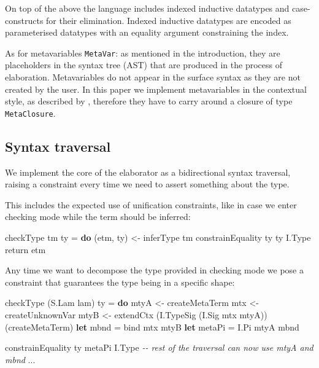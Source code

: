 \documentclass[
  sigconf,
  screen,
  review]{acmart}
\newenvironment{Shaded}{}{}
\newcommand{\CommentTok}[1]{\textcolor[rgb]{0.38,0.63,0.69}{\textit{#1}}}
\newcommand{\DataTypeTok}[1]{\textcolor[rgb]{0.56,0.13,0.00}{#1}}
\newcommand{\FunctionTok}[1]{\textcolor[rgb]{0.02,0.16,0.49}{#1}}
\newcommand{\KeywordTok}[1]{\textcolor[rgb]{0.00,0.44,0.13}{\textbf{#1}}}
\newcommand{\NormalTok}[1]{#1}
\newcommand{\OperatorTok}[1]{\textcolor[rgb]{0.40,0.40,0.40}{#1}}
\newcommand{\OtherTok}[1]{\textcolor[rgb]{0.00,0.44,0.13}{#1}}
\begin{document}
On top of the above the language includes indexed inductive datatypes
and case-constructs for their elimination. Indexed inductive datatypes
are encoded as parameterised datatypes with an equality argument
constraining the index.

As for metavariables \texttt{MetaVar}: as mentioned in the introduction,
they are placeholders in the syntax tree (AST) that are produced in the
process of elaboration. Metavariables do not appear in the surface
syntax as they are not created by the user. In this paper we implement
metavariables in the contextual style, as described by
\citet{abelHigherOrderDynamicPattern2011}, therefore they have to carry
around a closure of type \texttt{MetaClosure}.

\hypertarget{syntax-traversal}{%
\subsection{Syntax traversal}\label{syntax-traversal}}

We implement the core of the elaborator as a bidirectional syntax
traversal, raising a constraint every time we need to assert something
about the type.

This includes the expected use of unification constraints, like in case
we enter checking mode while the term should be inferred:

\begin{Shaded}
\begin{Highlighting}[]
\NormalTok{checkType tm ty }\OtherTok{=} \KeywordTok{do}
\NormalTok{  (etm, ty\textquotesingle{}) }\OtherTok{\textless{}{-}}\NormalTok{ inferType tm}
\NormalTok{  constrainEquality ty\textquotesingle{} ty }\DataTypeTok{I.Type}
  \FunctionTok{return}\NormalTok{ etm}
\end{Highlighting}
\end{Shaded}

Any time we want to decompose the type provided in checking mode we pose
a constraint that guarantees the type being in a specific shape:

\begin{Shaded}
\begin{Highlighting}[]
\NormalTok{checkType (}\DataTypeTok{S.Lam}\NormalTok{ lam) ty }\OtherTok{=} \KeywordTok{do}
\NormalTok{  mtyA }\OtherTok{\textless{}{-}}\NormalTok{ createMetaTerm}
\NormalTok{  mtx }\OtherTok{\textless{}{-}}\NormalTok{ createUnknownVar}
\NormalTok{  mtyB }\OtherTok{\textless{}{-}}\NormalTok{ extendCtx (}\DataTypeTok{I.TypeSig}\NormalTok{ (}\DataTypeTok{I.Sig}\NormalTok{ mtx mtyA))}
\NormalTok{                    (createMetaTerm)}
  \KeywordTok{let}\NormalTok{ mbnd }\OtherTok{=}\NormalTok{ bind mtx mtyB}
  \KeywordTok{let}\NormalTok{ metaPi }\OtherTok{=} \DataTypeTok{I.Pi}\NormalTok{ mtyA mbnd}

\NormalTok{  constrainEquality ty metaPi }\DataTypeTok{I.Type}
  \CommentTok{{-}{-} rest of the traversal can now use mtyA and mbnd}
  \OperatorTok{...}
\end{Highlighting}
\end{Shaded}
\end{document}
